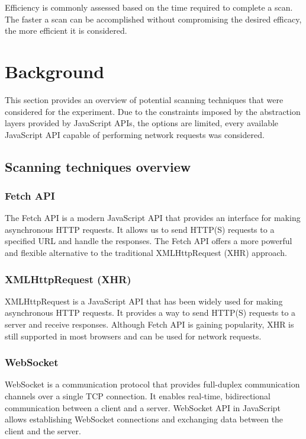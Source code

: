 Efficiency is commonly assessed based on the time required to complete a scan. The faster a scan can be accomplished without compromising the desired efficacy, the more efficient it is considered. 


\section{Background}

This section provides an overview of potential scanning techniques that were considered for the experiment. Due to the constraints imposed by the abstraction layers provided by JavaScript APIs, the options are limited, every available JavaScript API capable of performing network requests was considered.

\subsection{Scanning techniques overview}
\subsubsection{Fetch API}

The Fetch API is a modern JavaScript API that provides an interface for making asynchronous HTTP requests. It allows us to send HTTP(S) requests to a specified URL and handle the responses. The Fetch API offers a more powerful and flexible alternative to the traditional XMLHttpRequest (XHR) approach.

\subsubsection{XMLHttpRequest (XHR)}

XMLHttpRequest is a JavaScript API that has been widely used for making asynchronous HTTP requests. It provides a way to send HTTP(S) requests to a server and receive responses. Although Fetch API is gaining popularity, XHR is still supported in most browsers and can be used for network requests.

\subsubsection{WebSocket}

WebSocket is a communication protocol that provides full-duplex communication channels over a single TCP connection. It enables real-time, bidirectional communication between a client and a server. WebSocket API in JavaScript allows establishing WebSocket connections and exchanging data between the client and the server.

